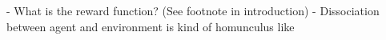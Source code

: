 \label{conclusion}


- What is the reward function? (See footnote in introduction)
- Dissociation between agent and environment is kind of homunculus like
